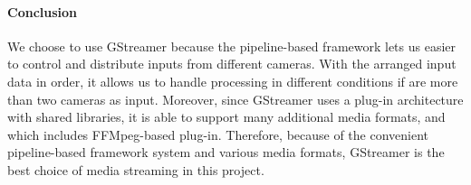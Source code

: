 \paragraph{Conclusion}
We choose to use GStreamer because the pipeline-based framework lets us easier to control and distribute 
inputs from different cameras. With the arranged input data in order, it allows us to handle processing 
in different conditions if are more than two cameras as input. Moreover, since GStreamer uses a plug-in 
architecture with shared libraries, it is able to support many additional media formats, and which 
includes FFMpeg-based plug-in. Therefore, because of the convenient pipeline-based framework system and 
various media formats, GStreamer is the best choice of media streaming in this project.\\
